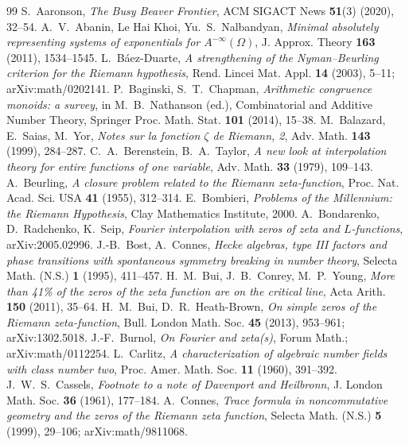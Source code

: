 \begin{thebibliography}{99}
\small
{} S.~Aaronson, \emph{The Busy Beaver Frontier}, ACM SIGACT News \textbf{51}(3) (2020), 32--54.
 A.~V.~Abanin, Le Hai Khoi, Yu.~S.~Nalbandyan, \emph{Minimal absolutely representing systems of exponentials for $A^{-\infty}(\Omega)$}, J. Approx. Theory \textbf{163} (2011), 1534--1545.
 L.~Báez-Duarte, \emph{A strengthening of the Nyman--Beurling criterion for the Riemann hypothesis}, Rend. Lincei Mat. Appl. \textbf{14} (2003), 5--11; arXiv:math/0202141.
 P.~Baginski, S.~T.~Chapman, \emph{Arithmetic congruence monoids: a survey}, in M.~B.~Nathanson (ed.), Combinatorial and Additive Number Theory, Springer Proc. Math. Stat. \textbf{101} (2014), 15--38.
 M.~Balazard, E.~Saias, M.~Yor, \emph{Notes sur la fonction $\zeta$ de Riemann, 2}, Adv. Math. \textbf{143} (1999), 284--287.
 C.~A.~Berenstein, B.~A.~Taylor, \emph{A new look at interpolation theory for entire functions of one variable}, Adv. Math. \textbf{33} (1979), 109--143.
 A.~Beurling, \emph{A closure problem related to the Riemann zeta-function}, Proc. Nat. Acad. Sci. USA \textbf{41} (1955), 312--314.
 E.~Bombieri, \emph{Problems of the Millennium: the Riemann Hypothesis}, Clay Mathematics Institute, 2000.
 A.~Bondarenko, D.~Radchenko, K.~Seip, \emph{Fourier interpolation with zeros of zeta and $L$-functions}, arXiv:2005.02996.
 J.-B.~Bost, A.~Connes, \emph{Hecke algebras, type III factors and phase transitions with spontaneous symmetry breaking in number theory}, Selecta Math. (N.S.) \textbf{1} (1995), 411--457.
 H.~M.~Bui, J.~B.~Conrey, M.~P.~Young, \emph{More than 41\% of the zeros of the zeta function are on the critical line}, Acta Arith. \textbf{150} (2011), 35--64.
 H.~M.~Bui, D.~R.~Heath-Brown, \emph{On simple zeros of the Riemann zeta-function}, Bull. London Math. Soc. \textbf{45} (2013), 953--961; arXiv:1302.5018.
 J.-F.~Burnol, \emph{On Fourier and zeta(s)}, Forum Math.; arXiv:math/0112254.
 L.~Carlitz, \emph{A characterization of algebraic number fields with class number two}, Proc. Amer. Math. Soc. \textbf{11} (1960), 391--392.
 J.~W.~S.~Cassels, \emph{Footnote to a note of Davenport and Heilbronn}, J. London Math. Soc. \textbf{36} (1961), 177--184.
 A.~Connes, \emph{Trace formula in noncommutative geometry and the zeros of the Riemann zeta function}, Selecta Math. (N.S.) \textbf{5} (1999), 29--106; arXiv:math/9811068.

\end{thebibliography}
